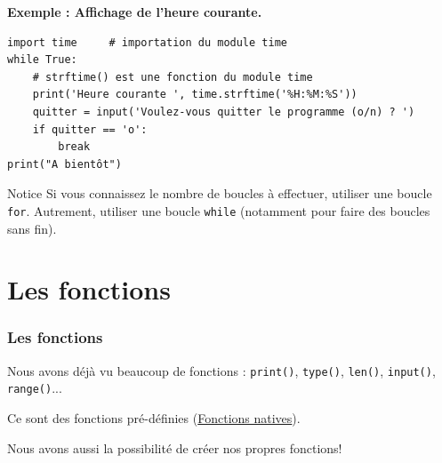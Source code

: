 \documentclass{beamer}
\begin{document}
\begin{frame}

\noindent\textbf{Exemple : Affichage de l'heure courante.}
\begin{verbatim}
import time     # importation du module time
while True:
    # strftime() est une fonction du module time
    print('Heure courante ', time.strftime('%H:%M:%S'))
    quitter = input('Voulez-vous quitter le programme (o/n) ? ')
    if quitter == 'o':
        break
print("A bientôt")
\end{verbatim}

\begin{block}{Notice}
Si vous connaissez le nombre de boucles à effectuer, utiliser une boucle \texttt{for}.
Autrement, utiliser une boucle \texttt{while} (notamment pour faire des boucles sans fin).
\end{block}
\end{frame}

\section{Les fonctions}

\begin{frame}
\frametitle{Les fonctions}


Nous avons déjà vu beaucoup de fonctions : \texttt{print()}, \texttt{type()}, \texttt{len()}, \texttt{input()}, \texttt{range()}...

Ce sont des fonctions pré-définies (\href{{https://docs.python.org/fr/3/library/functions.html}}{Fonctions natives}).

Nous avons aussi la possibilité de créer nos propres fonctions!


\end{frame}
\end{document}
